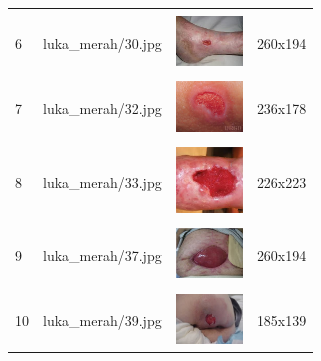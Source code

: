 \begin{table}[H]
\begin{tabular}{|m{0.2in}|m{1.2in}|m{0.7in}|m{0.7in}|}
		& &  &  \\
		6& 
		luka\_merah/30.jpg &
		\includegraphics[width=0.7in]{gambar/dataset_citra/luka_merah/30.jpg}&
		260x194\\
		\hline
		
		& &  &  \\
		7& 
		luka\_merah/32.jpg &
		\includegraphics[width=0.7in]{gambar/dataset_citra/luka_merah/32.jpg}&
		236x178\\
		\hline

			
		& &  &  \\
		8 & 
		luka\_merah/33.jpg &
		\includegraphics[width=0.7in]{gambar/dataset_citra/luka_merah/33.jpg}&
		226x223\\
		\hline
		
		& &  &  \\
		9& 
		luka\_merah/37.jpg &
		\includegraphics[width=0.7in]{gambar/dataset_citra/luka_merah/37.jpg}&
		260x194\\
		\hline
		
		& &  &  \\
		10& 
		luka\_merah/39.jpg &
		\includegraphics[width=0.7in]{gambar/dataset_citra/luka_merah/39.jpg}&
		185x139\\
		\hline

	\end{tabular}
\end{table}

